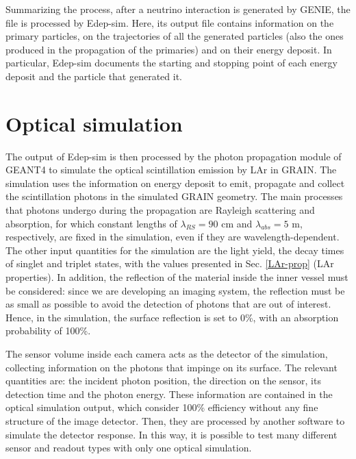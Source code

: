 Summarizing the process, after a neutrino interaction is generated by GENIE, the file is processed by Edep-sim. Here, its output file contains information on the primary particles, on the trajectories of all the generated particles (also the ones produced in the propagation of the primaries) and on their energy deposit. In particular, Edep-sim documents the starting and stopping point of each energy deposit and the particle that generated it. 

\section{Optical simulation}
The output of Edep-sim is then processed by the photon propagation module of GEANT4 to simulate the optical scintillation emission by LAr in GRAIN. The simulation uses the information on energy deposit to emit, propagate and collect the scintillation photons in the simulated GRAIN geometry. The main processes that photons undergo during the propagation are Rayleigh scattering and absorption, for which constant lengths of $\lambda_{RS} = 90$ cm and $\lambda_{abs} = 5$ m, respectively, are fixed in the simulation, even if they are wavelength-dependent. The other input quantities for the simulation are the light yield, the decay times of singlet and triplet states, with the values presented in Sec. \ref{LAr-prop} (LAr properties). In addition, the reflection of the material inside the inner vessel must be considered: since we are developing an imaging system, the reflection must be as small as possible to avoid the detection of photons that are out of interest. Hence, in the simulation, the surface reflection is set to 0\%, with an absorption probability of 100\%. 

The sensor volume inside each camera acts as the detector of the simulation, collecting information on the photons that impinge on its surface. The relevant quantities are: the incident photon position, the direction on the sensor, its detection time and the photon energy. These information are contained in the optical simulation output, which consider 100\% efficiency without any fine structure of the image detector. Then, they are processed by another software to simulate the detector response. In this way, it is possible to test many different sensor and readout types with only one optical simulation.

